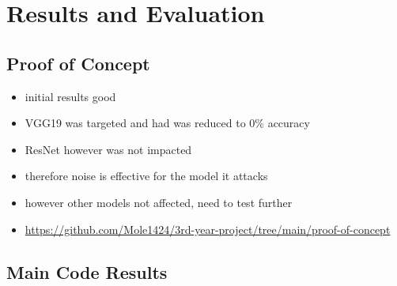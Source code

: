\chapter{Results and Evaluation}
\label{ch:evaluation}

\section{Proof of Concept}
\label{sec:concept-results}

\begin{itemize}
    \item initial results good
    \item VGG19 was targeted and had was reduced to 0\% accuracy
    \item ResNet however was not impacted
    \item therefore noise is effective for the model it attacks
    \item however other models not affected, need to test further
    \item \url{https://github.com/Mole1424/3rd-year-project/tree/main/proof-of-concept}
\end{itemize}

\section{Main Code Results}


